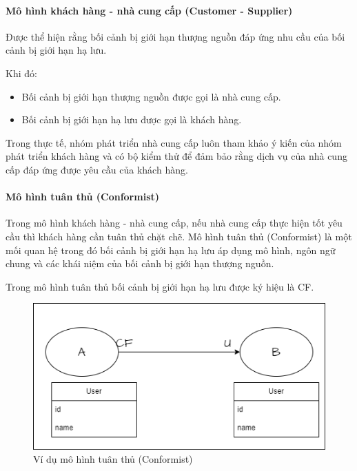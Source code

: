 \paragraph{Mô hình khách hàng - nhà cung cấp (Customer - Supplier)}


Được thể hiện rằng bối cảnh bị giới hạn thượng nguồn đáp ứng nhu cầu của bối cảnh bị giới hạn hạ lưu.

Khi đó:

\begin{itemize}

\item Bối cảnh bị giới hạn thượng nguồn được gọi là nhà cung cấp.

\item Bối cảnh bị giới hạn hạ lưu được gọi là khách hàng.

\end{itemize}

Trong thực tế, nhóm phát triển nhà cung cấp luôn tham khảo ý kiến của nhóm phát triển khách hàng và có bộ kiểm thử để đảm bảo rằng dịch vụ của nhà cung cấp đáp ứng được yêu cầu của khách hàng.









\paragraph{Mô hình tuân thủ (Conformist)}   






Trong mô hình khách hàng - nhà cung cấp, nếu nhà cung cấp thực hiện tốt yêu cầu thì khách hàng cần tuân thủ chặt chẽ. Mô hình tuân thủ (Conformist) là một mối quan hệ trong đó bối cảnh bị giới hạn hạ lưu áp dụng mô hình, ngôn ngữ chung và các khái niệm của bối cảnh bị giới hạn thượng nguồn.

Trong mô hình tuân thủ bối cảnh bị giới hạn hạ lưu được ký hiệu là CF.



\begin{figure}[H]

\centering

\includegraphics[scale = 0.5]{pictures/_vi_du_mo_hinh_tuan_thu_conformist/map.drawio.png}

\caption{Ví dụ mô hình  tuân thủ (Conformist)}

\end{figure}








